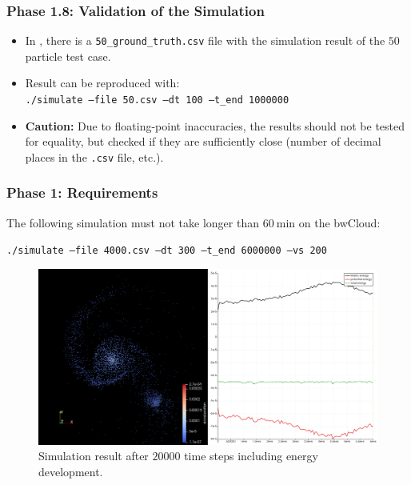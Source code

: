 \begin{frame}[fragile]
  \frametitle{Phase 1.8: Validation of the Simulation}
    \begin{itemize}
        \item In , there is a \texttt{50\_ground\_truth.csv} file with the simulation result of the $\num{50}$ particle test case.
        \item Result can be reproduced with:\\
        \texttt{./simulate --file 50.csv --dt 100 --t_end 1000000}
        \item \textbf{Caution:} Due to floating-point inaccuracies, the results should not be tested for equality, but checked if they are sufficiently close (number of decimal places in the \texttt{.csv} file, etc.).
    \end{itemize}
\end{frame}

\begin{frame}[fragile, label={phase1_anforderungen}]
  \frametitle{Phase 1: Requirements}
  \vspace{.5em}
  The following simulation must not take longer than $\SI{60}{\minute}$ on the bwCloud:
  \begin{center}
    \setfontsize{10.3pt}
    \texttt{./simulate --file 4000.csv --dt 300 --t_end 6000000 --vs 200} \\[.75em]
    \begin{figure}
        \includegraphics[width=.65\textwidth]{figures/result_phase_1.png}
        \caption{Simulation result after $\num{20000}$ time steps including energy development.}
    \end{figure}
  \end{center}
\end{frame}

